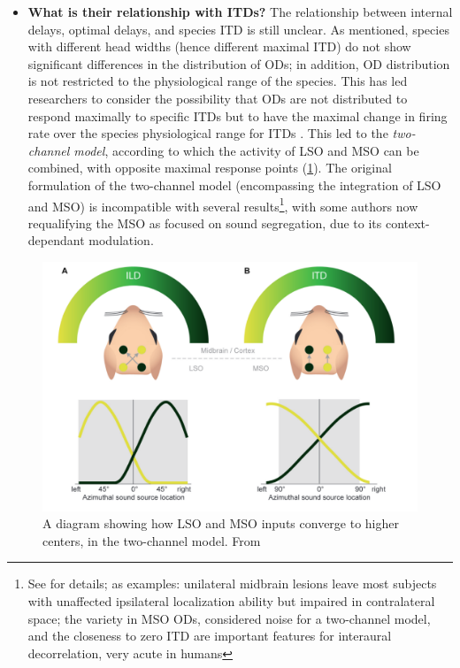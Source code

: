 \documentclass[11pt,a4paper]{article}
\begin{document}
\begin{itemize}
    \item \textbf{What is their relationship with ITDs?} The relationship between internal delays, optimal delays, and species ITD is still unclear. As mentioned, species with different head widths (hence different maximal ITD) do not show significant differences in the distribution of ODs; in addition, OD distribution is not restricted to the physiological range of the species. This has led researchers to consider the possibility that ODs are not distributed to respond maximally to specific ITDs but to have the maximal change in firing rate over the species physiological range for ITDs \cite{mcalpineNeuralCodeLowfrequency2001a}\cite{harperOptimalNeuralPopulation2004}. This led to the \textit{two-channel model}, according to which the activity of LSO and MSO can be combined, with opposite maximal response points (\ref{fig:twochann}). The original formulation of the two-channel model (encompassing the integration of LSO and MSO) is incompatible with several results\footnote{See \cite{yinNeuralMechanismsBinaural2019} for details; as examples: unilateral midbrain lesions leave most subjects with unaffected ipsilateral localization ability but impaired in contralateral space; the variety in MSO ODs, considered noise for a two-channel model, and the closeness to zero ITD are important features for interaural decorrelation, very acute in humans}, with some authors \cite{grotheNaturalHistorySound2014} now requalifying the MSO as focused on sound segregation, due to its context-dependant modulation.
\end{itemize}

\begin{figure}
    \centering
    \includegraphics[width=0.5\linewidth]{Images/two_channel_model.png}
    \caption{A diagram showing how LSO and MSO inputs converge to higher centers, in the two-channel model. From \cite{grotheMechanismsSoundLocalization2010}}
    \label{fig:twochann}
\end{figure}
\end{document}

